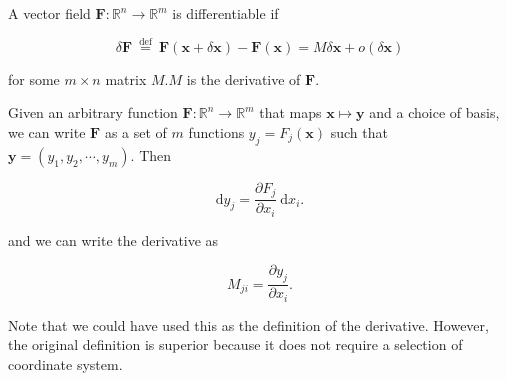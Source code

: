 \begin{ndefi}
	
	A vector field $\mathbf{F}: \mathbb{R}^n \rightarrow \mathbb{R}^m$ is differentiable if
	
	$$
	\delta \mathbf{F} \stackrel{\text { def }}{=} \mathbf{F}(\mathbf{x}+\delta \mathbf{x})-\mathbf{F}(\mathbf{x})=M \delta \mathbf{x}+o(\delta \mathbf{x})
	$$
	
	for some $m \times n$ matrix $M . M$ is the derivative of $\mathbf{F}$.
	
\end{ndefi}

\begin{nthm}
	
	Given an arbitrary function $\mathbf{F}: \mathbb{R}^n \rightarrow \mathbb{R}^m$ that maps $\mathbf{x} \mapsto \mathbf{y}$ and a choice of basis, we can write $\mathbf{F}$ as a set of $m$ functions $y_j=F_j(\mathbf{x})$ such that $\mathbf{y}= \left(y_1, y_2, \cdots, y_m\right)$. Then
	
	$$
	\mathrm{d} y_j=\frac{\partial F_j}{\partial x_i} \mathrm{~d} x_i .
	$$
	
	and we can write the derivative as
	
	$$
	M_{j i}=\frac{\partial y_j}{\partial x_i} .
	$$
	
	
	Note that we could have used this as the definition of the derivative. However, the original definition is superior because it does not require a selection of coordinate system.
	
\end{nthm}

